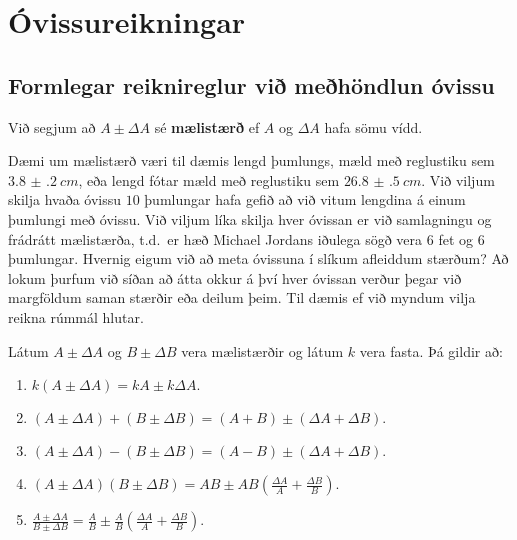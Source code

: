 \ifdefined \wholebook \else\documentclass[oneside]{book}\usepackage{EdlBook}\graphicspath{{figures/}}
\begin{document}
%
\setcounter{chapter}{1} %
%
\fi

\renewcommand{\thefigure}{\arabic{figure}}


\chapter{Óvissureikningar}

\section{Formlegar reiknireglur við meðhöndlun óvissu}

\begin{tcolorbox}
\begin{definition}
Við segjum að $A \pm \Delta A$ sé \textbf{mælistærð} ef $A$ og $\Delta A$ hafa sömu vídd.
\end{definition}
\end{tcolorbox}

Dæmi um mælistærð væri til dæmis lengd þumlungs, mæld með reglustiku sem $\SI{3.8(2)}{cm}$, eða lengd fótar mæld með reglustiku sem $\SI{26.8(5)}{cm}$. Við viljum skilja hvaða óvissu $10$ þumlungar hafa gefið að við vitum lengdina á einum þumlungi með óvissu. Við viljum líka skilja hver óvissan er við samlagningu og frádrátt mælistærða, t.d.~er hæð Michael Jordans iðulega sögð vera 6 fet og 6 þumlungar.
Hvernig eigum við að meta óvissuna í slíkum afleiddum stærðum?
Að lokum þurfum við síðan að átta okkur á því hver óvissan verður þegar við margföldum saman stærðir eða deilum þeim. Til dæmis ef við myndum vilja reikna rúmmál hlutar.

\begin{tcolorbox}
\begin{setning} \label{Th:uncertain}
Látum $A \pm \Delta A$ og $B \pm \Delta B$ vera mælistærðir og látum $k$ vera fasta. Þá gildir að:
\begin{enumerate}[label = \textbf{(\roman*)}]
    \item $k(A\pm \Delta A) = k A \pm k \Delta A.$
    \item $(A \pm \Delta A) + (B \pm \Delta B) =  (A+B) \pm (\Delta A + \Delta B).$
    \item $(A \pm \Delta A) - (B \pm \Delta B) =  (A-B) \pm (\Delta A + \Delta B).$
    \item $(A \pm \Delta A)(B \pm \Delta B) =  AB \pm AB\left( \frac{\Delta A}{A} + \frac{\Delta B}{B} \right).$
    \item $\frac{A \pm \Delta A}{B \pm \Delta B} =  \frac{A}{B} \pm \frac{A}{B} \left( \frac{\Delta A}{A} + \frac{\Delta B}{B} \right).$
\end{enumerate}
\end{setning}
\end{tcolorbox}
\end{document}

